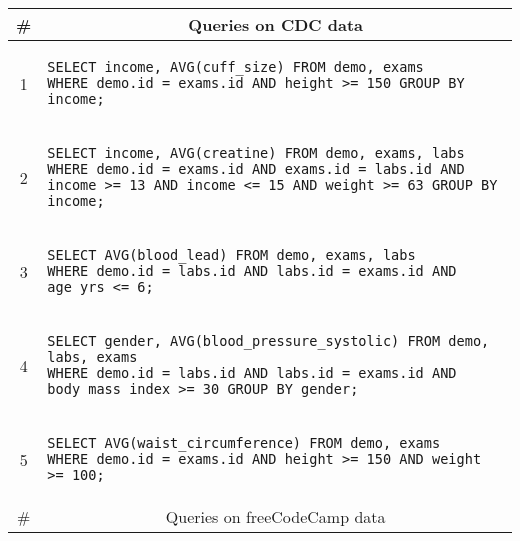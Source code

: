 \begin{tabular}{cl}
\toprule
\# & \multicolumn{1}{c}{Queries on CDC data} \\
\midrule
1 & 
\begin{minipage}{6in}
\begin{lstlisting}[breaklines]
SELECT income, AVG(cuff_size) FROM demo, exams 
WHERE demo.id = exams.id AND height >= 150 GROUP BY income;
\end{lstlisting}
\end{minipage}{queryno}\label[query]{q1} \\
2 & 
\begin{minipage}{6in}
\begin{lstlisting}[breaklines]
SELECT income, AVG(creatine) FROM demo, exams, labs 
WHERE demo.id = exams.id AND exams.id = labs.id AND income >= 13 AND income <= 15 AND weight >= 63 GROUP BY income;
\end{lstlisting}
\end{minipage}
{queryno}\label[query]{q2} \\
3 & 
\begin{minipage}{6in}
\begin{lstlisting}[breaklines]
SELECT AVG(blood_lead) FROM demo, exams, labs 
WHERE demo.id = labs.id AND labs.id = exams.id AND age_yrs <= 6;
\end{lstlisting}
\end{minipage}{queryno}\label[query]{q3}\\
4 & 
\begin{minipage}{6in}
\begin{lstlisting}[breaklines]
SELECT gender, AVG(blood_pressure_systolic) FROM demo, labs, exams 
WHERE demo.id = labs.id AND labs.id = exams.id AND body_mass_index >= 30 GROUP BY gender;
\end{lstlisting}
\end{minipage}{queryno}\label[query]{q4}\\
5 & 
\begin{minipage}{6in}
\begin{lstlisting}[breaklines]
SELECT AVG(waist_circumference) FROM demo, exams 
WHERE demo.id = exams.id AND height >= 150 AND weight >= 100;
\end{lstlisting}
\end{minipage}{queryno}\label[query]{q5}\\
  \midrule
\# & \multicolumn{1}{c}{Queries on freeCodeCamp data} \\

\end{tabular}
